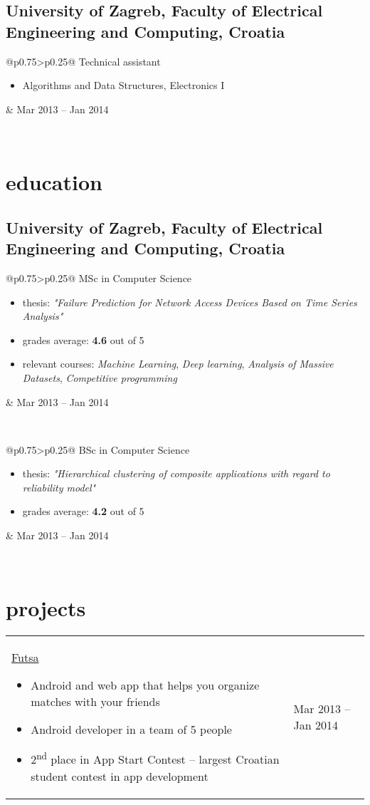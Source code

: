 \documentclass[a4paper]{article}
\makeatletter
\newlength{\tablewidth}
\newenvironment{period}[2]{%
\newcommand{\sarma}{#2}%
\setlength{\tablewidth}{\linewidth}
\addtolength{\tablewidth}{-2\tabcolsep}
\begin{tabular}{@{}p{0.75\tablewidth}>{\raggedleft\arraybackslash}p{0.25\tablewidth}@{}}%
#1 \newline
\begin{itemize}
}{%
\end{itemize} & \sarma \\%
\end{tabular}\\
}
\makeatother
\begin{document}
\subsection{University of Zagreb, Faculty of Electrical Engineering and Computing, Croatia}

\begin{period}{Technical assistant}{Mar 2013 -- Jan 2014}
    \item Algorithms and Data Structures, Electronics I
\end{period}

\section{education}
\subsection{University of Zagreb, Faculty of Electrical Engineering and Computing, Croatia}
\begin{period}{MSc in Computer Science}{Oct 2015 -- Jul 2017}
    \item thesis:
        \textit{"Failure Prediction for Network Access Devices Based on Time Series Analysis"}
    \item grades average: \textbf{4.6} out of 5
    \item relevant courses:
        \textit{Machine Learning},
        \textit{Deep learning},
        \textit{Analysis of Massive Datasets},
        \textit{Competitive programming}
\end{period}
\begin{period}{BSc in Computer Science}{Oct 2012 -- Jul 2015}
	\item thesis:
        \textit{"Hierarchical clustering of composite applications with regard to reliability model"}
    \item grades average: \textbf{4.2} out of 5
\end{period}

\section{projects}

\begin{period}{\href{http://futsa.net}{Futsa}}{Feb 2017 -- Jun 2017}
	\item Android and web app that helps you organize matches with your friends
	\item Android developer in a team of 5 people
	\item
		2\textsuperscript{nd} place in App Start Contest -- largest Croatian student contest in app development

\end{period}
\end{document}

